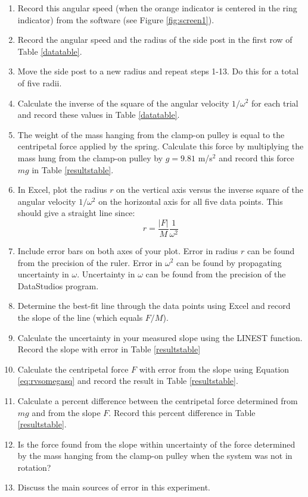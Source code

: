 \begin{enumerate}
	\item Record this angular speed (when the orange indicator is centered in the ring indicator) from the software (see Figure \ref{fig:screen1}). 
	\item Record the angular speed and the radius of the side post in the first row of Table \ref{datatable}.
	\item Move the side post to a new radius and repeat steps 1-13. Do this for a total of five radii.
	\item Calculate the inverse of the square of the angular velocity $1/\omega^2$ for each trial and record these values in Table \ref{datatable}.
	\item The weight of the mass hanging from the clamp-on pulley is equal to the centripetal force applied by the spring. Calculate this force by multiplying the mass hung from the clamp-on pulley by $g = 9.81$ m/s$^{2}$ and record this force $mg$ in Table \ref{resultstable}.	
	\item In Excel, plot the radius $r$ on the vertical axis versus the inverse square of the angular velocity $1/\omega^2$ on the horizontal axis for all five data points. This should give a straight line since:
	\begin{equation}
		r = \frac{|F|}{M}\frac{1}{\omega^2}
	\label{eq:rvsomegasq}
	\end{equation}
	\item Include error bars on both axes of your plot. Error in radius $r$ can be found from the precision of the ruler. Error in $\omega^2$ can be found by propagating uncertainty in $\omega$. Uncertainty in $\omega$ can be found from the precision of the DataStudios program.
	\item Determine the best-fit line through the data points using Excel and record the slope of the line (which equals $F/M$).
	\item Calculate the uncertainty in your measured slope using the LINEST function. Record the slope with error in Table \ref{resultstable} 
	\item Calculate the centripetal force $F$ with error from the slope using Equation \ref{eq:rvsomegasq}
 and record the result in Table \ref{resultstable}.
	\item Calculate a percent difference between the centripetal force determined from $mg$ and from the slope $F$.  Record this percent difference in Table \ref{resultstable}.
	\item Is the force found from the slope within uncertainty of the force determined by the mass hanging from the clamp-on pulley when the system was not in rotation?  
	\item Discuss the main sources of error in this experiment.
\end{enumerate}

